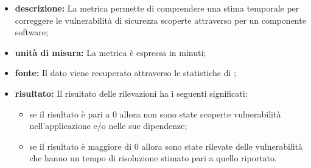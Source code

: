 			\begin{itemize}
      			\item \textbf{descrizione: }
					La metrica permette di comprendere una stima temporale per correggere le vulnerabilità di sicurezza scoperte attraverso  per un componente software;
				\item \textbf{unità di misura: }
					La metrica è espressa in minuti;
				\item \textbf{fonte: }
					Il dato viene recuperato attraverso le statistiche di ;
				\item \textbf{risultato: }
					Il risultato delle rilevazioni ha i seguenti significati:
					\begin{itemize}
						\item se il risultato è pari a 0 allora non sono state scoperte vulnerabilità nell'applicazione e/o nelle sue dipendenze;
						\item se il risultato è maggiore di 0 allora sono state rilevate delle vulnerabilità che hanno un tempo di risoluzione stimato pari a quello riportato.
					\end{itemize}
			\end{itemize}





